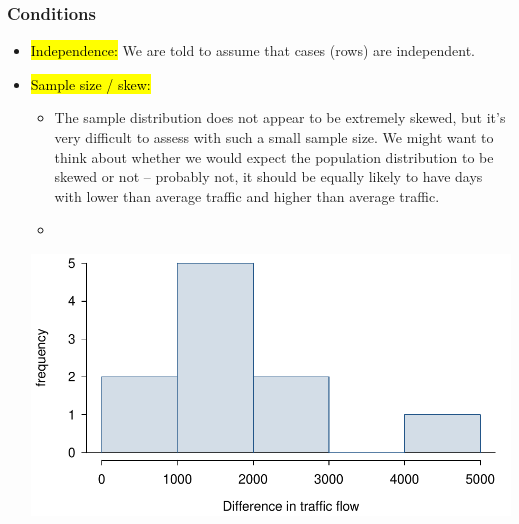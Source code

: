 
\begin{frame}
\frametitle{Conditions}

\begin{itemize}

\item \hl{Independence:} We are told to assume that cases (rows) are independent.

\pause

\item \hl{Sample size / skew:} $\:$ \\

\pause

{
{\tiny
\begin{itemize}

\item The sample distribution does not appear to be extremely skewed, but it's very difficult to assess with such a small sample size. We might want to think about whether we would expect the population distribution to be skewed or not -- probably not, it should be equally likely to have days with lower than average traffic and higher than average traffic.

\item {}
\end{itemize}
}
}
{
\includegraphics[width=\textwidth]{5-3_one_t/figures/friday/trafficHist}
}

\end{itemize}

$\:$ \\

\pause


\end{frame}

